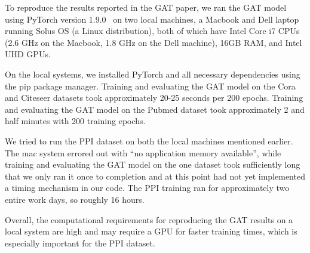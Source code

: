 To reproduce the results reported in the GAT paper, we ran the GAT model using
PyTorch version 1.9.0~\cite{paszke2019pytorch} on two local machines, a Macbook
and Dell laptop running Solus OS (a Linux distribution), both of which have
Intel Core i7 CPUs (2.6 GHz on the Macbook, 1.8 GHz on the Dell machine), 16GB
RAM, and Intel UHD GPUs.

On the local systems, we installed PyTorch and all necessary dependencies using
the pip package manager. Training and evaluating the GAT model on the Cora and
Citeseer datasets took approximately 20-25 seconds per 200 epochs. Training and
evaluating the GAT model on the Pubmed dataset took approximately 2 and half
minutes with 200 training epochs.

We tried to run the PPI dataset on both the local machines mentioned earlier.
The mac system errored out with ``no application memory available'', while training and evaluating the GAT
model on the one dataset took sufficiently long that we only ran it once to completion and
at this point had not yet implemented a timing mechanism in our code. The PPI
training ran for approximately two entire work days, so roughly 16 hours.

Overall, the computational requirements for reproducing the GAT results on a
local system are high and may require a GPU for faster training times,
which is especially important for the PPI dataset.
